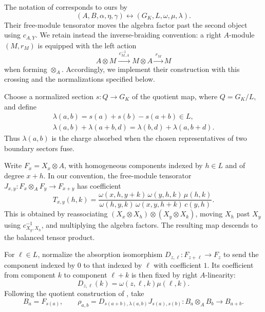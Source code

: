 \documentclass[12pt]{amsart}
\numberwithin{equation}{section}
\theoremstyle{definition}
\begin{document}
The notation of \cite[Appendix~A]{DavydovSimmons2018} corresponds to
ours by
$$
(A,B,\alpha,\eta,\gamma)
\longleftrightarrow
(G_K,L,\omega,\mu,\lambda).
$$
Their free-module tensorator moves the algebra factor past the
second object using $c_{A,Y}$. We retain instead the inverse-braiding
convention: a right $A$-module $(M,r_M)$ is equipped with the left
action
$$
A\otimes M
\xrightarrow{\,c_{M,A}^{-1}\,}
M\otimes A
\xrightarrow{\,r_M\,}
M
$$
when forming $\otimes_A$. Accordingly, we implement their
construction with this crossing and the normalizations specified
below.

Choose a normalized section $s:Q\to G_K$ of the quotient map,
where $Q=G_K/L$, and define
\begin{equation}
\label{eq:gauge-screening}
\begin{gathered}
\lambda(a,b)=s(a)+s(b)-s(a+b)\in L,\\
\lambda(a,b)+\lambda(a+b,d)
=\lambda(b,d)+\lambda(a,b+d).
\end{gathered}
\end{equation}
Thus $\lambda(a,b)$ is the charge absorbed when the chosen
representatives of two boundary sectors fuse.

Write $F_x=X_x\otimes A$, with homogeneous components indexed by
$h\in L$ and of degree $x+h$. In our convention, the free-module
tensorator
$J_{x,y}:F_x\otimes_A F_y\to F_{x+y}$ has coefficient
\begin{equation}
\label{eq:gauge-free-tensorator}
T_{x,y}(h,k)=
\frac{\omega(x,h,y+k)\,\omega(y,h,k)\,\mu(h,k)}
{\omega(h,y,k)\,\omega(x,y,h+k)\,c(y,h)}.
\end{equation}
This is obtained by reassociating
$(X_x\otimes X_h)\otimes(X_y\otimes X_k)$, moving $X_h$
past $X_y$ using $c_{X_y,X_h}^{-1}$, and multiplying the
algebra factors. The resulting map descends to the balanced
tensor product.

For $\ell\in L$, normalize the absorption isomorphism
$D_{z,\ell}:F_{z+\ell}\to F_z$ to send the component indexed
by $0$ to that indexed by $\ell$ with coefficient $1$.
Its coefficient from component $k$ to component $\ell+k$ is
then fixed by right $A$-linearity:
\begin{equation}
\label{eq:gauge-absorption}
D_{z,\ell}(k)=\omega(z,\ell,k)\mu(\ell,k).
\end{equation}
Following the quotient construction of
\cite[Appendix~A]{DavydovSimmons2018}, take
$$
B_a=F_{s(a)},\qquad
\rho_{a,b}
=D_{s(a+b),\lambda(a,b)}J_{s(a),s(b)}
:B_a\otimes_A B_b\longrightarrow B_{a+b}.
$$
\end{document}
